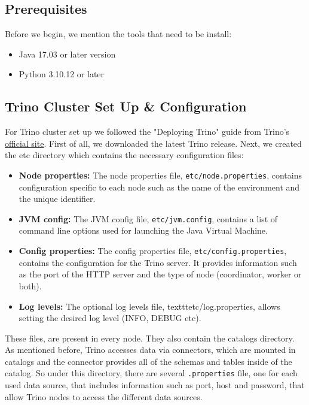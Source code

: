 \documentclass[conference]{IEEEtran}
\begin{document}
\subsection{Prerequisites}

Before we begin, we mention the tools that need to be install:

\begin{itemize}
    \item {Java 17.03 or later version}
    \item {Python 3.10.12 or later}
\end{itemize}

\subsection{Trino Cluster Set Up \& Configuration}

For Trino cluster set up we followed the "Deploying Trino" guide from Trino's \textcolor{linkblue}{\underline{\href{https://trino.io/docs/current/installation/deployment.html}{official site}}}.
First of all, we downloaded the latest Trino release. Next, we created the etc directory which contains the necessary configuration files:

\begin{itemize}
    \item \textbf{Node properties:} The node properties file, \texttt{etc/node.properties}, contains configuration specific to each node such as the name of the environment and the unique identifier.
    \item \textbf{JVM config:} The JVM config file, \texttt{etc/jvm.config}, contains a list of command line options used for launching the Java Virtual Machine. 
    \item \textbf{Config properties:} The config properties file, \texttt{etc/config.properties}, contains the configuration for the Trino server. It provides information such as the port of the HTTP server and the type of node (coordinator, worker or both). 
    \item \textbf{Log levels:} The optional log levels file, texttt{etc/log.properties}, allows setting the desired log level (INFO, DEBUG etc).
\end{itemize}

These files, are present in every node. They also contain the catalogs directory. As mentioned before, Trino accesses data via connectors, which are mounted in catalogs and the connector provides all 
of the schemas and tables inside of the catalog. So under this directory, there are several \texttt{.properties} file, one for each used data source, that includes information such as port, host and password, 
that allow Trino nodes to access the different data sources.
\end{document}
